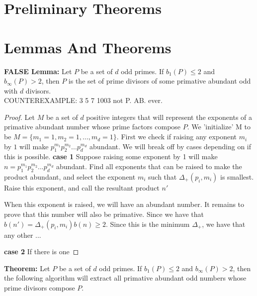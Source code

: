 \documentclass[../paper.tex]{subfiles}
\begin{document}
\section{Preliminary Theorems}

\section*{Lemmas And Theorems}\par\hspace{4ex}
\textbf{FALSE Lemma:} Let $P$ be a set of $d$ odd primes. If $b_{1}(P) \leq 2$
and $b_{\infty}(P) > 2$, then $P$ is the set of prime divisors of 
some primative abundant odd with $d$ divisors.\\ COUNTEREXAMPLE:
3 5 7 1003 not P. AB. ever.

\begin{proof}

Let $M$ be a set of $d$ positive integers that will represent
the exponents of a primative abundant number whose prime factors
compose $P$. We 'initialize' M to be
%
$M = \{m_1=1, m_2=1, ..., m_d=1 \}$. 
%
First we check if raising any exponent $m_i$ by $1$ will make 
$p_1^{m_1} p_2^{m_2} ... p_d^{m_d}$ abundant. We will break off
by cases depending on if this is possible.
\textbf{case 1}
	Suppose raising some exponent by 1 will make $n = p_1^{m_1} 
p_2^{m_2} ... p_d^{m_d}$ abundant. Find all exponents that can be
raised to make the product abundant, and select the exponent $m_i$
such that $\Delta_{+}(p_i, m_i)$ is smallest. Raise this exponent,
and call the resultant product $n'$

When this exponent is raised, we will have an abundant number. It
remains to prove that this number will also be primative. Since
we have that $b(n') = \Delta_{+}(p_i, m_i) b(n) \geq 2$. Since 
this is the minimum $\Delta_{+}$, we have that any other ...

\textbf{case 2}
If there is one 
%


\end{proof}


\textbf{Theorem:} Let $P$ be a set of $d$ odd primes. If $b_{1}(P) \leq 2$
and $b_{\infty}(P) > 2$, then the following algorithm will extract all primative
abundant odd numbers whose prime divisors compose $P$.
\end{document}
